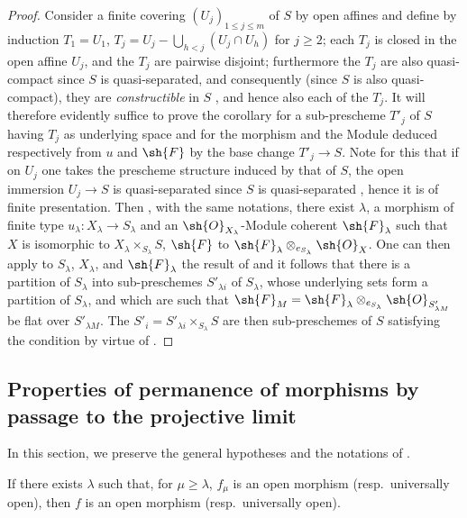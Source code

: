 \begin{proof}
Consider a finite covering $(U_j)_{1\leqslant j\leqslant m}$ of $S$ by open affines and define by induction $T_1=U_1$, $T_j=U_j-\bigcup_{h<j}(U_j\cap U_h)$ for $j\geqslant 2$; each $T_j$ is closed in the open affine $U_j$, and the $T_j$ are pairwise disjoint; furthermore the $T_j$ are also quasi-compact since $S$ is quasi-separated, and consequently (since $S$ is also quasi-compact), they are \emph{constructible} in $S$ , and hence also each of the $T_j$.
It will therefore evidently suffice to prove the corollary for a sub-prescheme $T'_j$ of $S$ having $T_j$ as underlying space and for the morphism and the Module deduced
respectively from $u$ and $\sh{F}$ by the base change $T'_j\to S$.
Note for this that if on $U_j$ one takes the prescheme structure induced by that of $S$, the open immersion $U_j\to S$ is quasi-separated since $S$ is quasi-separated , hence it is of finite presentation.
Then , with the same notations, there exist $\lambda$, a morphism of finite type $u_\lambda:X_\lambda\to S_\lambda$ and an $\sh{O}_{X_\lambda}$-Module coherent $\sh{F}_\lambda$ such that $X$ is isomorphic to $X_\lambda\times_{S_\lambda}S$, $\sh{F}$ to $\sh{F}_\lambda\otimes_{e_{S_\lambda}}\sh{O}_X$.
One can then apply to $S_\lambda$, $X_\lambda$, and $\sh{F}_\lambda$ the result of  and it follows that there is a partition of $S_\lambda$ into sub-preschemes $S'_{\lambda i}$ of $S_\lambda$, whose underlying sets form a partition of $S_\lambda$, and which are such that $\sh{F}_{M}=\sh{F}_\lambda\otimes_{e_{S_\lambda}}\sh{O}_{S'_{\lambda M}}$ be flat over $S'_{\lambda M}$.
The $S'_i=S'_{\lambda i}\times_{S_\lambda}S$ are then sub-preschemes of $S$ satisfying the condition by virtue of .
\end{proof}

\subsection{Properties of permanence of morphisms by passage to the projective limit}
\label{subsection:IV.8.10}

In this section, we preserve the general hypotheses and the notations of .

\begin{proposition}[8.10.1]
\label{IV.8.10.1}
If there exists $\lambda$ such that, for $\mu\geqslant\lambda$, $f_\mu$ is an open morphism (resp.\ universally open), then $f$ is an open morphism (resp.\ universally open).
\end{proposition}

